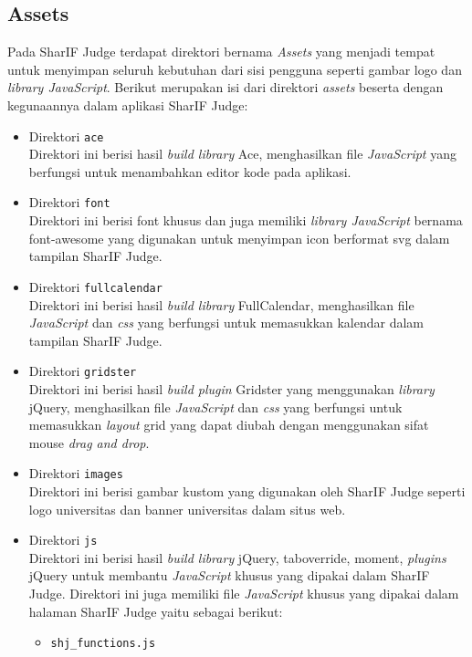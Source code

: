 \subsection{Assets}
Pada SharIF Judge terdapat direktori bernama \textit{Assets} yang menjadi tempat untuk menyimpan seluruh kebutuhan dari sisi pengguna seperti gambar logo dan \textit{library JavaScript}. Berikut merupakan isi dari direktori \textit{assets} beserta dengan kegunaannya dalam aplikasi SharIF Judge:

\begin{itemize}
	\item Direktori \verb|ace| \\
	      Direktori ini berisi hasil \textit{build library} Ace, menghasilkan file \textit{JavaScript} yang berfungsi untuk menambahkan editor kode pada aplikasi.
	\item Direktori \verb|font| \\
	      Direktori ini berisi font khusus dan juga memiliki \textit{library JavaScript} bernama font-awesome yang digunakan untuk menyimpan icon berformat svg dalam tampilan SharIF Judge.
	\item Direktori \verb|fullcalendar| \\
	      Direktori ini berisi hasil \textit{build library} FullCalendar, menghasilkan file \textit{JavaScript} dan \textit{css} yang berfungsi untuk memasukkan kalendar dalam tampilan SharIF Judge.
	\item Direktori \verb|gridster| \\
	      Direktori ini berisi hasil \textit{build plugin} Gridster yang menggunakan \textit{library} jQuery, menghasilkan file \textit{JavaScript} dan \textit{css} yang berfungsi untuk memasukkan \textit{layout} grid yang dapat diubah dengan menggunakan sifat mouse \textit{drag and drop}.
	\item Direktori \verb|images| \\
	      Direktori ini berisi gambar kustom yang digunakan oleh SharIF Judge seperti logo universitas dan banner universitas dalam situs web.
	\item Direktori \verb|js| \\
	      Direktori ini berisi hasil \textit{build library} jQuery, taboverride, moment, \textit{plugins} jQuery untuk membantu \textit{JavaScript} khusus yang dipakai dalam SharIF Judge. Direktori ini juga memiliki file \textit{JavaScript} khusus yang dipakai dalam halaman SharIF Judge yaitu sebagai berikut:
	      \begin{itemize}
		      \item \verb|shj_functions.js| \\

\end{itemize}
\end{itemize}
